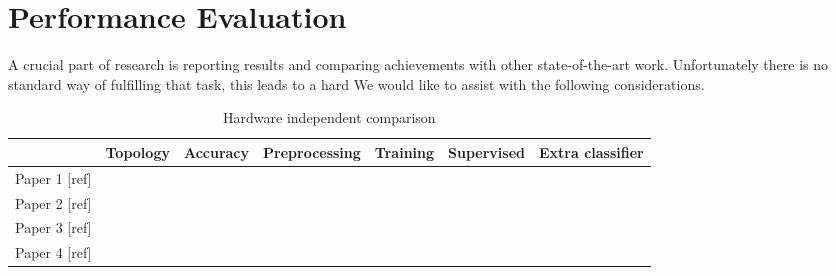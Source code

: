 \section{Performance Evaluation}
\label{sec:eval}

A crucial part of research is reporting results and comparing achievements with other state-of-the-art work. Unfortunately there is no standard way of fulfilling that task, this leads to a hard 
We would like to assist with the following considerations.
\begin{table*}[hbt!]
  \caption{Hardware independent comparison}
  \begin{center}
    \bgroup
    \def\arraystretch{1.4}
    \begin{tabular}{ l | c c c c c c }
      $ $ &
      \begin{minipage}{1.9cm}Topology \end{minipage} & 
      \begin{minipage}{1.9cm}Accuracy \end{minipage} & 
      \begin{minipage}{1.9cm}Preprocessing \end{minipage} &
      \begin{minipage}{1.9cm}Training \end{minipage} & 
      \begin{minipage}{1.9cm}Supervised \end{minipage} &
      \begin{minipage}{1.9cm}Extra classifier \end{minipage} \\
      \hline
      \begin{minipage}{2cm} Paper 1 [ref] \end{minipage}  & & & & & & \\
      \begin{minipage}{2cm} Paper 2 [ref]\end{minipage}  & & & & & & \\
      \begin{minipage}{2cm} Paper 3 [ref]\end{minipage}  & & & & & & \\
      \begin{minipage}{2cm} Paper 4 [ref]\end{minipage}  & & & & & & 
    \end{tabular}
    \egroup
  \end{center}
  \label{tb:software_comparison}
\end{table*}

